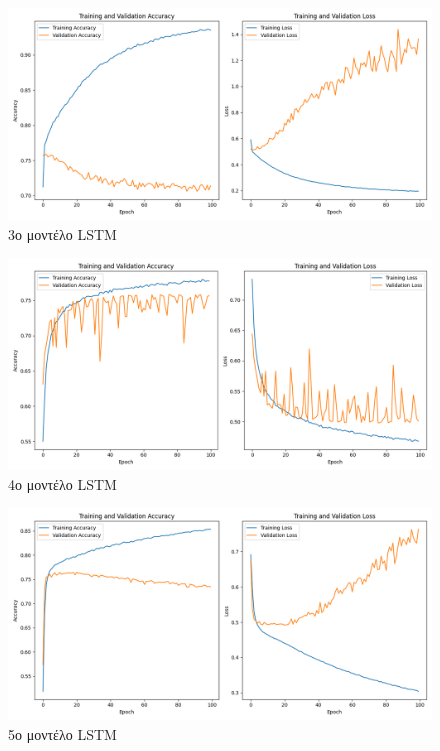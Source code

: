 \begin{figure}[ht]
	\centering
	\includegraphics[width=1\linewidth]{Results/LSTM/lstm3.png}
	\caption{ 3ο μοντέλο LSTM}
	\label{f:g7}	
\end{figure}

\begin{figure}[ht]
	\centering
	\includegraphics[width=1\linewidth]{Results/LSTM/lstm4.png}
	\caption{ 4ο μοντέλο LSTM}
	\label{f:g8}	
\end{figure}

\begin{figure}[ht]
	\centering
	\includegraphics[width=1\linewidth]{Results/LSTM/lstm5.png}
	\caption{ 5ο μοντέλο LSTM}
	\label{f:g9}	
\end{figure}

